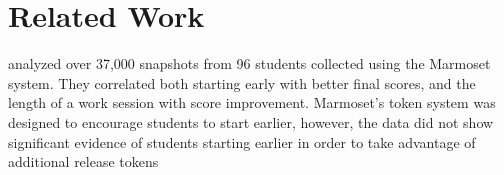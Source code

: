 \section{Related Work}
\spacco{} analyzed over 37,000 snapshots from 96 students collected using the
Marmoset system. They correlated both starting early with better final scores,
and the length of a work session with score improvement. Marmoset's token
system was designed to encourage students to start earlier, however, the data
did not show significant evidence of students starting earlier in order to take
advantage of additional release tokens~\cite{Spacco:2013:TIP:2462476.2465594,
  Spacco:2006:EMD:1140124.1140131}
